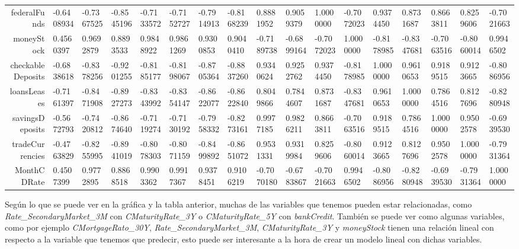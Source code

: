 \documentclass[11pt]{article}
\begin{document}
\begin{tabular}{r|llllllllllllllll}
	federalFunds & -0.6408934 & -0.7367525 & -0.8545196 & -0.7133572 & -0.7152727 & -0.7914913 & -0.8168239 &  0.8881952 &  0.9059379 &  1.0000000 & -0.7072023 &  0.9374450 &  0.8731687 &  0.8663811 &  0.8259606 & -0.7021663\\
	moneyStock &  0.4560397 &  0.9692879 &  0.8893533 &  0.9848922 &  0.9861269 &  0.9300853 &  0.9040410 & -0.7189738 & -0.6899164 & -0.7072023 &  1.0000000 & -0.8178985 & -0.8347681 & -0.7063516 & -0.8060014 &  0.9946502\\
	checkableDeposits & -0.6838618 & -0.8378256 & -0.9201255 & -0.8185177 & -0.8198067 & -0.8705364 & -0.8837260 &  0.9340624 &  0.9252762 &  0.9374450 & -0.8178985 &  1.0000000 &  0.9610653 &  0.9189515 &  0.9123665 & -0.8086956\\
	loansLeases & -0.7161397 & -0.8471908 & -0.8927273 & -0.8343992 & -0.8354147 & -0.8622077 & -0.8622840 &  0.8049866 &  0.7844607 &  0.8731687 & -0.8347681 &  0.9610653 &  1.0000000 &  0.7864516 &  0.8127696 & -0.8280948\\
	savingsDeposits & -0.5672793 & -0.7420812 & -0.8674640 & -0.7119274 & -0.7130192 & -0.7958332 & -0.8273161 &  0.9977185 &  0.9826211 &  0.8663811 & -0.7063516 &  0.9189515 &  0.7864516 &  1.0000000 &  0.9502578 & -0.6939530\\
	tradeCurrencies & -0.4763829 & -0.8255995 & -0.8941019 & -0.8078303 & -0.8071159 & -0.8499892 & -0.8651072 &  0.9531331 &  0.9319984 &  0.8259606 & -0.8060014 &  0.9123665 &  0.8127696 &  0.9502578 &  1.0000000 & -0.7931364\\
	MonthCDRate &  0.4507399 &  0.9772895 &  0.8868518 &  0.9903362 &  0.9917367 &  0.9378451 &  0.9106219 & -0.7070180 & -0.6783867 & -0.7021663 &  0.9946502 & -0.8086956 & -0.8280948 & -0.6939530 & -0.7931364 &  1.0000000\\
\end{tabular}


    
    Según lo que se puede ver en la gráfica y la tabla anterior, muchas de
las variables que tenemos pueden estar relacionadas, como
\emph{Rate\_SecondaryMarket\_3M} con \emph{CMaturityRate\_3Y} o
\emph{CMaturityRate\_5Y} con \emph{bankCredit}. También se puede ver
como algunas variables, como por ejemplo \emph{CMortgageRato\_30Y},
\emph{Rate\_SecondaryMarket\_3M}, \emph{CMaturityRate\_3Y} y
\emph{moneyStock} tienen una relación lineal con respecto a la variable
que tenemos que predecir, esto puede ser interesante a la hora de crear
un modelo lineal con dichas variables.
\end{document}

